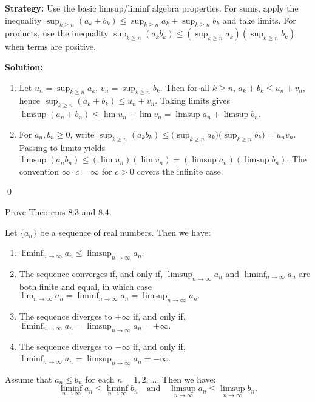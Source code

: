 \noindent\textbf{Strategy:} Use the basic limsup/liminf algebra properties. For sums, apply the inequality \(\sup_{k\ge n}(a_k+b_k)\le \sup_{k\ge n} a_k + \sup_{k\ge n} b_k\) and take limits. For products, use the inequality \(\sup_{k\ge n}(a_k b_k)\le (\sup_{k\ge n} a_k)(\sup_{k\ge n} b_k)\) when terms are positive.

\bigskip\noindent\textbf{Solution:}
\begin{enumerate}[label=(\alph*)]
\item Let \(u_n=\sup_{k\ge n} a_k\), \(v_n=\sup_{k\ge n} b_k\). Then for all \(k\ge n\), \(a_k+b_k\le u_n+v_n\), hence \(\sup_{k\ge n}(a_k+b_k)\le u_n+v_n\). Taking limits gives \(\limsup(a_n+b_n)\le \lim u_n+\lim v_n=\limsup a_n+\limsup b_n\).
\item For \(a_n,b_n\ge 0\), write \(\sup_{k\ge n}(a_k b_k)\le \big(\sup_{k\ge n} a_k\big)\big(\sup_{k\ge n} b_k\big)=u_n v_n\). Passing to limits yields \(\limsup(a_n b_n)\le (\lim u_n)(\lim v_n)=(\limsup a_n)(\limsup b_n)\). The convention \(\infty\cdot c=\infty\) for \(c>0\) covers the infinite case.
\end{enumerate}\qed


\begin{problembox}
\begin{problemstatement}
Prove Theorems 8.3 and 8.4.

\begin{theorem}[Theorem 8.3]
Let \(\{a_n\}\) be a sequence of real numbers. Then we have:
\begin{enumerate}[label=\alph*)]
\item \(\liminf_{n \to \infty} a_n \leq \limsup_{n \to \infty} a_n.\)
\item The sequence converges if, and only if, \(\limsup_{n \to \infty} a_n\) and \(\liminf_{n \to \infty} a_n\) are both finite and equal, in which case \(\lim_{n \to \infty} a_n = \liminf_{n \to \infty} a_n = \limsup_{n \to \infty} a_n.\)
\item The sequence diverges to \(+\infty\) if, and only if, \(\liminf_{n \to \infty} a_n = \limsup_{n \to \infty} a_n = +\infty.\)
\item The sequence diverges to \(-\infty\) if, and only if, \(\liminf_{n \to \infty} a_n = \limsup_{n \to \infty} a_n = -\infty\).
\end{enumerate}
\end{theorem}

\begin{theorem}[Theorem 8.4]
Assume that \(a_n \leq b_n\) for each \(n = 1, 2, \ldots\). Then we have:
\[
\liminf_{n \to \infty} a_n \leq \liminf_{n \to \infty} b_n \quad \text{and} \quad \limsup_{n \to \infty} a_n \leq \limsup_{n \to \infty} b_n.
\]
\end{theorem}
\end{problemstatement}
\end{problembox}

